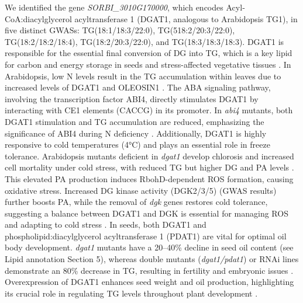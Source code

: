 \documentclass[10pt,letterpaper]{article}
\begin{document}
We identified the gene \textit{SORBI\_3010G170000}, which encodes Acyl‐CoA:diacylglycerol acyltransferase 1 (DGAT1, analogous to Arabidopsis TG1), in five distinct GWASs: TG(18:1/18:3/22:0), TG(518:2/20:3/22:0), TG(18:2/18:2/18:4), TG(18:2/20:3/22:0), and TG(18:3/18:3/18:3). DGAT1 is responsible for the essential final conversion of DG into TG, which is a key lipid for carbon and energy storage in seeds and stress-affected vegetative tissues \cite{Zhang2009,Yang2011}. In Arabidopsis, low N levels result in the TG accumulation within leaves due to increased levels of DGAT1 and OLEOSIN1 \cite{Yang2011}. The ABA signaling pathway, involving the transcription factor ABI4, directly stimulates DGAT1 by interacting with CE1 elements (CACCG) in its promoter. In \emph{abi4} mutants, both DGAT1 stimulation and TG accumulation are reduced, emphasizing the significance of ABI4 during N deficiency \cite{Yang2011}. Additionally, DGAT1 is highly responsive to cold temperatures (4°C) and plays an essential role in freeze tolerance. Arabidopsis mutants deficient in \emph{dgat1} develop chlorosis and increased cell mortality under cold stress, with reduced TG but higher DG and PA levels \cite{Tan2018}. This elevated PA production induces RbohD-dependent ROS formation, causing oxidative stress. Increased DG kinase activity (DGK2/3/5) (GWAS results) further boosts PA, while the removal of \emph{dgk} genes restores cold tolerance, suggesting a balance between DGAT1 and DGK is essential for managing ROS and adapting to cold stress \cite{Tan2018}. In seeds, both DGAT1 and phospholipid:diacylglycerol acyltransferase 1 (PDAT1) are vital for optimal oil body development. \emph{dgat1} mutants have a 20–40\% decline in seed oil content (see Lipid annotation Section 5), whereas double mutants (\emph{dgat1/pdat1}) or RNAi lines demonstrate an 80\% decrease in TG, resulting in fertility and embryonic issues \cite{Zhang2009}. Overexpression of DGAT1 enhances seed weight and oil production, highlighting its crucial role in regulating TG levels throughout plant development \cite{Zhang2009,Yang2011}.
\end{document}
